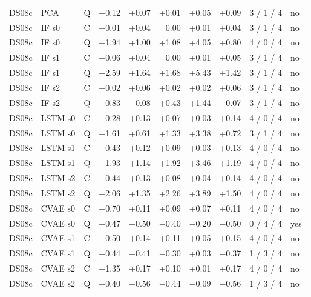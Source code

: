 \documentclass[10pt]{article}
\begin{document}
{\begin{longtable}{lllrrrrrcl}
DS08c & PCA & Q & +0.12 & +0.07 & +0.01 & +0.05 & +0.09 & 3 / 1 / 4 & no \\
DS08c & IF s0 & C & −0.01 & +0.04 & 0.00 & +0.01 & +0.04 & 3 / 1 / 4 & no \\
DS08c & IF s0 & Q & +1.94 & +1.00 & +1.08 & +4.05 & +0.80 & 4 / 0 / 4 & no \\
DS08c & IF s1 & C & −0.06 & +0.04 & 0.00 & +0.01 & +0.05 & 3 / 1 / 4 & no \\
DS08c & IF s1 & Q & +2.59 & +1.64 & +1.68 & +5.43 & +1.42 & 3 / 1 / 4 & no \\
DS08c & IF s2 & C & +0.02 & +0.06 & +0.02 & +0.02 & +0.06 & 3 / 1 / 4 & no \\
DS08c & IF s2 & Q & +0.83 & −0.08 & +0.43 & +1.44 & −0.07 & 3 / 1 / 4 & no \\
DS08c & LSTM s0 & C & +0.28 & +0.13 & +0.07 & +0.03 & +0.14 & 4 / 0 / 4 & no \\
DS08c & LSTM s0 & Q & +1.61 & +0.61 & +1.33 & +3.38 & +0.72 & 3 / 1 / 4 & no \\
DS08c & LSTM s1 & C & +0.43 & +0.12 & +0.09 & +0.03 & +0.13 & 4 / 0 / 4 & no \\
DS08c & LSTM s1 & Q & +1.93 & +1.14 & +1.92 & +3.46 & +1.19 & 4 / 0 / 4 & no \\
DS08c & LSTM s2 & C & +0.44 & +0.13 & +0.08 & +0.04 & +0.14 & 4 / 0 / 4 & no \\
DS08c & LSTM s2 & Q & +2.06 & +1.35 & +2.26 & +3.89 & +1.50 & 4 / 0 / 4 & no \\
DS08c & CVAE s0 & C & +0.70 & +0.11 & +0.09 & +0.07 & +0.11 & 4 / 0 / 4 & no \\
DS08c & CVAE s0 & Q & +0.47 & −0.50 & −0.40 & −0.20 & −0.50 & 0 / 4 / 4 & yes \\
DS08c & CVAE s1 & C & +0.50 & +0.14 & +0.11 & +0.05 & +0.15 & 4 / 0 / 4 & no \\
DS08c & CVAE s1 & Q & +0.44 & −0.41 & −0.30 & +0.03 & −0.37 & 1 / 3 / 4 & no \\
DS08c & CVAE s2 & C & +1.35 & +0.17 & +0.10 & +0.01 & +0.17 & 4 / 0 / 4 & no \\
DS08c & CVAE s2 & Q & +0.40 & −0.56 & −0.44 & −0.09 & −0.56 & 1 / 3 / 4 & no \\
\end{longtable}
\vspace{-0.6em}
}
\end{document}
